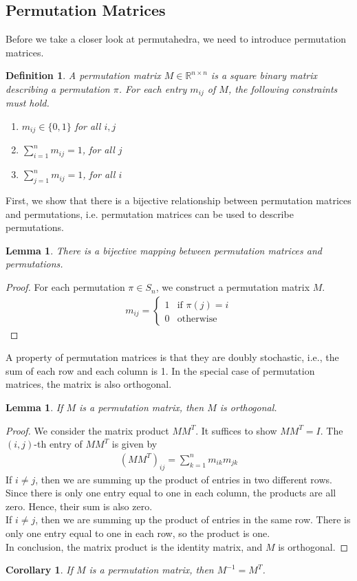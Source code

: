 \documentclass[12pt,letterpaper]{article}
\newcommand*{\R}{\mathbb{R}}
\newtheorem{definition}[theorem]{Definition}
\newtheorem{lemma}[theorem]{Lemma}
\newtheorem{corollary}[theorem]{Corollary}
\begin{document}
\subsection{Permutation Matrices}
Before we take a closer look at permutahedra, we need to introduce permutation matrices.
\begin{definition}
    A permutation matrix $M \in \R^{n \times n}$ is a square binary matrix describing a permutation $\pi$.
    For each entry $m_{ij}$ of $M$, the following constraints must hold.
    \begin{enumerate}
        \item $m_{ij} \in \{0, 1\}$ for all $i, j$
        \item $\sum_{i = 1}^n m_{ij} = 1$, for all $j$
        \item $\sum_{j = 1}^n m_{ij} = 1$, for all $i$
    \end{enumerate}
\end{definition}
First, we show that there is a bijective relationship between permutation matrices and permutations, i.e. permutation matrices 
can be used to describe permutations.
\begin{lemma}
    There is a bijective mapping between permutation matrices and permutations.
\end{lemma}
\begin{proof}
    For each permutation $\pi \in S_n$, we construct a permutation matrix $M$.
    \begin{align*}
        m_{ij} = 
        \begin{cases}
            1 & \text{if } \pi(j) = i \\
            0 & \text{otherwise}
        \end{cases}
    \end{align*}
\end{proof}
A property of permutation matrices is that they are doubly stochastic, i.e., the sum of each row and each column is 1.
In the special case of permutation matrices, the matrix is also orthogonal.
\begin{lemma}
    If $M$ is a permutation matrix, then $M$ is orthogonal.
\end{lemma}
\begin{proof}
    We consider the matrix product $MM^T$. It suffices to show $MM^T = I$. The $(i, j)$-th entry of $MM^T$ is given by 
    \begin{align*}
        (MM^T)_{ij} = \sum_{k = 1}^n m_{ik}m_{jk}
    \end{align*}
    If $i \neq j$, then we are summing up the product of entries in two different rows. 
    Since there is only one entry equal to one in each column, the products are all zero. Hence, their sum is also zero. \\ 
    If $i \neq j$, then we are summing up the product of entries in the same row.
    There is only one entry equal to one in each row, so the product is one. \\
    In conclusion, the matrix product is the identity matrix, and $M$ is orthogonal.
\end{proof}
\begin{corollary}
    If $M$ is a permutation matrix, then $M^{-1} = M^T$.
\end{corollary}
\end{document}
